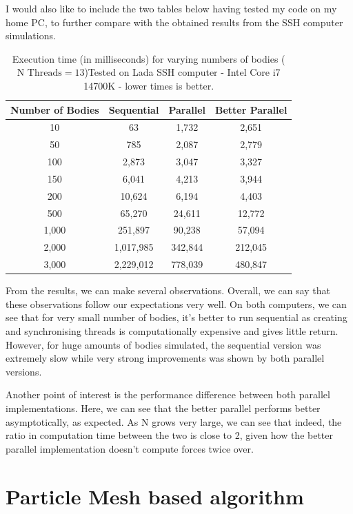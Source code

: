 \documentclass{article}
\begin{document}
I would also like to include the two tables below having tested my code on my home PC, to further compare with the obtained results from the SSH computer simulations.

\begin{table}[htbp]
\centering
\begin{tabular}{|c|c|c|c|}
\hline
\textbf{Number of Bodies} & \textbf{Sequential} & \textbf{Parallel} & \textbf{Better Parallel} \\
\hline
10     & 63  & 1,732  & 2,651   \\
50    & 785  & 2,087  & 2,779   \\
100   & 2,873  & 3,047  & 3,327   \\
150 & 6,041 & 4,213 & 3,944\\
200 & 10,624 & 6,194 & 4,403 \\ 
500 & 65,270 & 24,611 & 12,772 \\
1,000  &  251,897 & 90,238  &  57,094  \\
2,000 & 1,017,985& 342,844& 212,045\\
3,000 & 2,229,012 & 778,039 & 480,847 \\
\hline
\end{tabular}
\caption{Execution time (in milliseconds) for varying numbers of bodies ($\text{N Threads} = 13$)Tested on Lada SSH computer - Intel Core i7 14700K - lower times is better.}
\label{tab:thread_performance}
\end{table}

From the results, we can make several observations. Overall, we can say that these observations follow our expectations very well. On both computers, we can see that for very small number of bodies, it's better to run sequential as creating and synchronising threads is computationally expensive and gives little return. However, for huge amounts of bodies simulated, the sequential version was extremely slow while very strong improvements was shown by both parallel versions.

Another point of interest is the performance difference between both parallel implementations. Here, we can see that the better parallel performs better asymptotically, as expected. As N grows very large, we can see that indeed, the ratio in computation time between the two is close to 2, given how the better parallel implementation doesn't compute forces twice over.



\section{Particle Mesh based algorithm}
\end{document}
